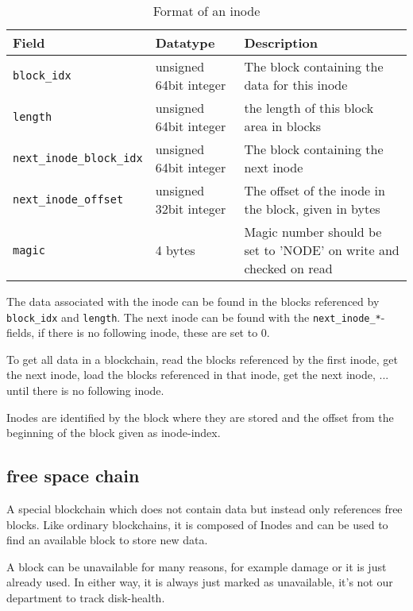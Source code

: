 \documentclass[a4paper,12pt]{article}
\begin{document}
			\begin{table}[ht]
				\caption{Format of an inode}\label{tab:2}
				\begin{tabularx}{\linewidth}{|l|l|X|} \hline
					\textbf{Field} 					& \textbf{Datatype} 		& \textbf{Description} \\ \hline
					\verb|block_idx| 				& unsigned 64bit integer 	& The block containing the data for this inode \\ \hline
					\verb|length| 				& unsigned 64bit integer 	& the length of this block area in blocks \\ \hline
					\verb|next_inode_block_idx| 	& unsigned 64bit integer 	& The block containing the next inode \\ \hline
					\verb|next_inode_offset| 		& unsigned 32bit integer	& The offset of the inode in the block, given in bytes \\ \hline
					\verb|magic|					& 4 bytes					& Magic number should be set to 'NODE' on write and checked on read \\ \hline
				\end{tabularx}
			\end{table}
			
			The data associated with the inode can be found in the blocks referenced by \verb|block_idx| and \verb|length|. The next inode can be found with the \verb|next_inode_*|-fields, if there is no following inode, these are set to 0.
		
			To get all data in a blockchain, read the blocks referenced by the first inode, get the next inode, load the blocks referenced in that inode, get the next inode, ... until there is no following inode.
			
			Inodes are identified by the block where they are stored and the offset from the beginning of the block given as inode-index.
		
		\subsection{free space chain}
			A special blockchain which does not contain data but instead only references free blocks. Like ordinary blockchains, it is composed of Inodes and can be used to find an available block to store new data.
			
			A block can be unavailable for many reasons, for example damage or it is just already used. In either way, it is always just marked as unavailable, it's not our department to track disk-health.
		
\end{document}

